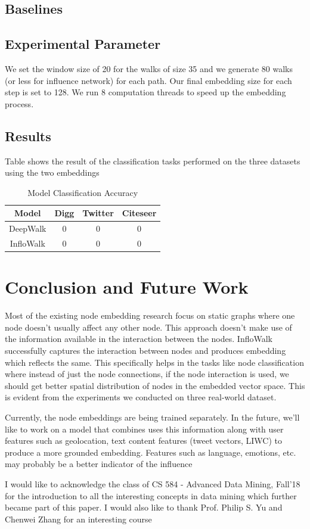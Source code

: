 \subsection{Baselines}


\subsection{Experimental Parameter}

We set the window size of 20 for the walks of size 35 and we generate 80 walks (or less for influence network) for each path. Our final embedding size for each step is set to 128. We run 8 computation threads to speed up the embedding process.

\subsection{Results}

Table shows the result of the classification tasks performed on the three datasets using the two embeddings

\begin{table}
  \caption{Model Classification Accuracy}
  \begin{tabular}{cccc}
    \toprule
    Model&Digg&Twitter&Citeseer\\
    \midrule
    DeepWalk&0&0&0\\
    InfloWalk&0&0&0\\
  \bottomrule
\end{tabular}
\end{table}


\section{Conclusion and Future Work}
Most of the existing node embedding research focus on static graphs where one node doesn't usually affect any other node. This approach doesn't make use of the information available in the interaction between the nodes. InfloWalk successfully captures the interaction between nodes and produces embedding which reflects the same. This specifically helps in the tasks like node classification where instead of just the node connections, if the node interaction is used, we should get better spatial distribution of nodes in the embedded vector space. This is evident from the experiments we conducted on three real-world dataset.

Currently, the node embeddings are being trained separately. In the future, we'll like to work on a model that combines uses this information along with user features such as geolocation, text content features (tweet vectors, LIWC) to produce a more grounded embedding. Features such as language, emotions, etc. may probably be a better indicator of the influence

\begin{acks}
I would like to acknowledge the class of CS 584 - Advanced Data Mining, Fall'18 for the introduction to all the interesting concepts in data mining which further became part of this paper. I would also like to thank Prof. Philip S. Yu and Chenwei Zhang for an interesting course
\end{acks}

